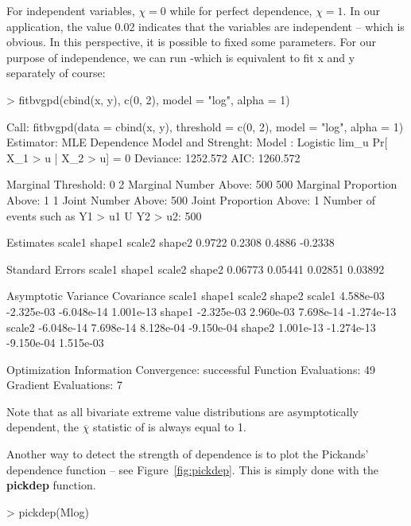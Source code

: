 \documentclass[a4paper]{article}
\numberwithin{equation}{section}
\theoremstyle{definition}
\begin{document}
For independent variables, $\chi = 0$ while for perfect dependence,
$\chi = 1$. In our application, the value 0.02 indicates that the
variables are independent -- which is obvious. In this perspective, it
is possible to fixed some parameters. For our purpose of independence,
we can run -which is equivalent to fit x and y separately of course:
\begin{Schunk}
\begin{Sinput}
> fitbvgpd(cbind(x, y), c(0, 2), model = "log", alpha = 1)
\end{Sinput}
\begin{Soutput}
Call: fitbvgpd(data = cbind(x, y), threshold = c(0, 2), model = "log",      alpha = 1) 
Estimator: MLE 
Dependence Model and Strenght:
	Model : Logistic 
	lim_u Pr[ X_1 > u | X_2 > u] = 0 
Deviance: 1252.572 
     AIC: 1260.572 

Marginal Threshold: 0 2 
Marginal Number Above: 500 500 
Marginal Proportion Above: 1 1 
Joint Number Above: 500 
Joint Proportion Above: 1 
Number of events such as {Y1 > u1} U {Y2 > u2}: 500 

Estimates
 scale1   shape1   scale2   shape2  
 0.9722   0.2308   0.4886  -0.2338  

Standard Errors
 scale1   shape1   scale2   shape2  
0.06773  0.05441  0.02851  0.03892  

Asymptotic Variance Covariance
        scale1      shape1      scale2      shape2    
scale1   4.588e-03  -2.325e-03  -6.048e-14   1.001e-13
shape1  -2.325e-03   2.960e-03   7.698e-14  -1.274e-13
scale2  -6.048e-14   7.698e-14   8.128e-04  -9.150e-04
shape2   1.001e-13  -1.274e-13  -9.150e-04   1.515e-03

Optimization Information
	Convergence: successful 
	Function Evaluations: 49 
	Gradient Evaluations: 7 
\end{Soutput}
\end{Schunk}

Note that as all bivariate extreme value distributions are
asymptotically dependent, the $\overline{\chi}$ statistic of
\citet{Coles1999} is always equal to 1.

Another way to detect the strength of dependence is to plot the
Pickands' dependence function -- see Figure~\ref{fig:pickdep}. This is
simply done with the \textbf{pickdep} function.

\begin{Schunk}
\begin{Sinput}
> pickdep(Mlog)
\end{Sinput}
\end{Schunk}
\end{document}
